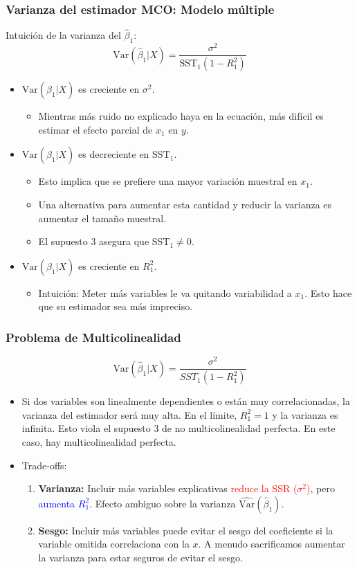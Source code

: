 \documentclass{beamer}
\begin{document}
\begin{frame}[shrink=10]
\frametitle{Varianza del estimador MCO: Modelo múltiple}
Intuición de la varianza del $\hat{\beta}_1$:
\[
\text{Var}(\hat{\beta}_1|X) = \frac{\sigma^2}{\text{SST}_1(1 - R_{1}^{2})}
\]
\begin{itemize}
    \item $\text{Var}(\hat{\beta}_1|X)$ es creciente en $\sigma^2$.
    \begin{itemize}
        \item Mientras más ruido no explicado haya en la ecuación, más difícil es estimar el efecto parcial de $x_1$ en $y$.
    \end{itemize}
    \item $\text{Var}(\hat{\beta}_1|X)$ es decreciente en $\text{SST}_1$.
    \begin{itemize}
        \item Esto implica que se prefiere una mayor variación muestral en $x_1$.
        \item Una alternativa para aumentar esta cantidad y reducir la varianza es aumentar el tamaño muestral.
        \item El supuesto 3 asegura que $\text{SST}_1 \neq 0$.
    \end{itemize}
    \item $\text{Var}(\hat{\beta}_1|X)$ es creciente en $R_{1}^{2}$.
    \begin{itemize}
        \item Intuición: Meter más variables le va quitando variabilidad a $x_1$. Esto hace que su estimador sea más impreciso.
    \end{itemize}
\end{itemize}
\end{frame}

\begin{frame}[shrink=10]
\frametitle{Problema de Multicolinealidad}
\[
\text{Var}(\hat{\beta}_1|X) = \frac{\sigma^2}{SST_1(1 - R^2_1)}
\]
\begin{itemize}
    \item Si dos variables son linealmente dependientes o están muy correlacionadas, la varianza del estimador será muy alta. En el límite, $R^2_1 = 1$ y la varianza es infinita. Esto viola el supuesto 3 de no multicolinealidad perfecta. En este caso, hay multicolinealidad perfecta.
    \item Trade-offs:
    \begin{enumerate}
        \item \textbf{Varianza:} Incluir más variables explicativas \textcolor{red}{reduce la SSR ($\sigma^2$)}, pero \textcolor{blue}{aumenta $R^2_1$}. Efecto ambiguo sobre la varianza $\hat{\text{Var}}(\hat{\beta}_1)$.
        \item \textbf{Sesgo:} Incluir más variables puede evitar el sesgo del coeficiente si la variable omitida correlaciona con la $x$. A menudo sacrificamos aumentar la varianza para estar seguros de evitar el sesgo.
    \end{enumerate}
\end{itemize}
\end{frame}
\end{document}
